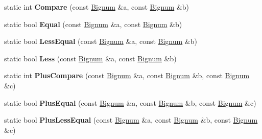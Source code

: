 \begin{DoxyCompactItemize}
\item 
static int {\bfseries Compare} (const \hyperlink{classv8_1_1internal_1_1_bignum}{Bignum} \&a, const \hyperlink{classv8_1_1internal_1_1_bignum}{Bignum} \&b)\hypertarget{classv8_1_1internal_1_1_bignum_abd9070a6a20568f1d8cd3a08aef2b83e}{}\label{classv8_1_1internal_1_1_bignum_abd9070a6a20568f1d8cd3a08aef2b83e}

\item 
static bool {\bfseries Equal} (const \hyperlink{classv8_1_1internal_1_1_bignum}{Bignum} \&a, const \hyperlink{classv8_1_1internal_1_1_bignum}{Bignum} \&b)\hypertarget{classv8_1_1internal_1_1_bignum_a59b3c8a39ea9d736d20360cffe274acb}{}\label{classv8_1_1internal_1_1_bignum_a59b3c8a39ea9d736d20360cffe274acb}

\item 
static bool {\bfseries Less\+Equal} (const \hyperlink{classv8_1_1internal_1_1_bignum}{Bignum} \&a, const \hyperlink{classv8_1_1internal_1_1_bignum}{Bignum} \&b)\hypertarget{classv8_1_1internal_1_1_bignum_a6b79c599b480768a071b4c78953d1377}{}\label{classv8_1_1internal_1_1_bignum_a6b79c599b480768a071b4c78953d1377}

\item 
static bool {\bfseries Less} (const \hyperlink{classv8_1_1internal_1_1_bignum}{Bignum} \&a, const \hyperlink{classv8_1_1internal_1_1_bignum}{Bignum} \&b)\hypertarget{classv8_1_1internal_1_1_bignum_a8ac355faefc238fb7896d9f9b8f92a14}{}\label{classv8_1_1internal_1_1_bignum_a8ac355faefc238fb7896d9f9b8f92a14}

\item 
static int {\bfseries Plus\+Compare} (const \hyperlink{classv8_1_1internal_1_1_bignum}{Bignum} \&a, const \hyperlink{classv8_1_1internal_1_1_bignum}{Bignum} \&b, const \hyperlink{classv8_1_1internal_1_1_bignum}{Bignum} \&c)\hypertarget{classv8_1_1internal_1_1_bignum_abcc8a3bef0ecc80e0fdf91cf3525930f}{}\label{classv8_1_1internal_1_1_bignum_abcc8a3bef0ecc80e0fdf91cf3525930f}

\item 
static bool {\bfseries Plus\+Equal} (const \hyperlink{classv8_1_1internal_1_1_bignum}{Bignum} \&a, const \hyperlink{classv8_1_1internal_1_1_bignum}{Bignum} \&b, const \hyperlink{classv8_1_1internal_1_1_bignum}{Bignum} \&c)\hypertarget{classv8_1_1internal_1_1_bignum_aee160e99c96f72218c024a094f5fa9f4}{}\label{classv8_1_1internal_1_1_bignum_aee160e99c96f72218c024a094f5fa9f4}

\item 
static bool {\bfseries Plus\+Less\+Equal} (const \hyperlink{classv8_1_1internal_1_1_bignum}{Bignum} \&a, const \hyperlink{classv8_1_1internal_1_1_bignum}{Bignum} \&b, const \hyperlink{classv8_1_1internal_1_1_bignum}{Bignum} \&c)\hypertarget{classv8_1_1internal_1_1_bignum_a3c1bd429a2efc47c8ddf0b94db3718ff}{}\label{classv8_1_1internal_1_1_bignum_a3c1bd429a2efc47c8ddf0b94db3718ff}


\end{DoxyCompactItemize}
